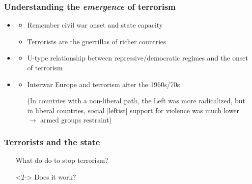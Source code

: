 \documentclass[aspectratio=43]{beamer}
\begin{document}
\begin{frame}
\frametitle{Understanding the \textit{emergence} of terrorism}
\centering

\begin{itemize}
  \item<1>[1.] {\color{red}{State capacity}}
  \begin{itemize}
    \item<1> Remember civil war onset and state capacity
    \item<1> Terrorists are the guerrillas of richer countries
  \end{itemize}
  \item<2>[2.] {\color{red}{Regime type}}
  \begin{itemize}
    \item<2> U-type relationship between repressive/democratic regimes and the onset of terrorism
  \end{itemize}
  \item<3>[3.] {\color{red}{Historical path-dependence}}
  \begin{itemize}
    \item<3> Interwar Europe and terrorism after the 1960s/70s
    \item[] {\scriptsize (In countries with a non-liberal path, the Left was more radicalized, but in liberal countries, social [leftist] support for violence was much lower $\rightarrow$ armed groups restraint)}
  \end{itemize}
\end{itemize}


\end{frame}

\begin{frame}
\frametitle{Terrorists and the state}
\centering

\begin{itemize}
  \item[] What do {\color{red}{states}} do to stop terrorism?
  \item[]<2-> Does it work?
\end{itemize}

\end{frame}
\end{document}
